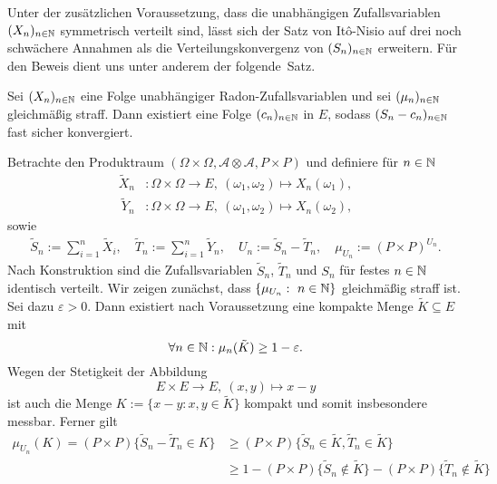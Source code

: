 Unter der zusätzlichen Voraussetzung, dass die unabhängigen Zufallsvariablen $(X_n)_{n \in \mathbb{N}}$ symmetrisch verteilt sind, lässt sich der Satz von Itô-Nisio auf drei noch schwächere Annahmen als die Verteilungskonvergenz von $(S_n)_{n \in \mathbb{N}}$ erweitern. 
Für den Beweis dient uns unter anderem der \mbox{folgende Satz.} 
\begin{theorem}
    Sei $(X_n)_{n \in \mathbb{N}}$ eine Folge unabhängiger Radon-Zufallsvariablen und sei $(\mu_n)_{n \in \mathbb{N}}$ gleichmäßig straff. Dann existiert eine Folge $(c_n)_{n \in \mathbb{N}}$ in $E$, sodass $(S_n - c_n)_{n \in \mathbb{N}}$ fast sicher konvergiert.
\end{theorem}

\begin{proof*}
    Betrachte den Produktraum $(\Omega \times \Omega, \mathcal{A} \otimes \mathcal{A}, P \times P)$ und definiere für $n \in \mathbb{N}$
    \begin{align*}
        \widetilde{X}_n&: \Omega \times \Omega \to E, \ (\omega_1, \omega_2) \mapsto X_n(\omega_1), \\\
        \widetilde{Y}_n&: \Omega \times \Omega \to E, \ (\omega_1, \omega_2) \mapsto X_n(\omega_2),
    \end{align*}
    sowie 
    \begin{align*}
        \widetilde{S}_n := \sum_{i = 1}^n \widetilde{X}_i, \quad \widetilde{T}_n := \sum_{i = 1}^n \widetilde{Y}_n, \quad U_n := \widetilde{S}_n - \widetilde{T}_n, \quad \mu_{U_n} := (P\times P)^{U_n}. 
    \end{align*}
    Nach Konstruktion sind die Zufallsvariablen $\widetilde{S}_n$, $\widetilde{T}_n$ und $S_n$ für festes $n \in \mathbb{N}$ identisch verteilt. Wir zeigen zunächst, dass $\{\mu_{U_n}: \ n \in \mathbb{N}\}$ gleichmäßig straff ist. 
    Sei dazu $\varepsilon > 0$. Dann existiert nach Voraussetzung eine kompakte Menge $\tilde{K} \subseteq E$ mit 
    $$
        \forall n \in \mathbb{N}: \mu_n(\tilde{K}) \geq 1 - \varepsilon. 
    $$
    Wegen der Stetigkeit der Abbildung 
    $$
        E \times E \to E, \ (x,y) \mapsto x - y
    $$
    ist auch die Menge $K := \{ x - y : x,y \in \tilde{K}\}$ kompakt und somit insbesondere messbar. Ferner gilt
    \begin{align*}
        \mu_{U_n}(K) = (P \times P)\{\widetilde{S}_n - \widetilde{T}_n \in K\} &\geq (P \times P)\{\widetilde{S}_n \in \tilde{K}, \widetilde{T}_n \in \tilde{K}\} \\\
                                                              &\geq 1 - (P \times P)\{\widetilde{S}_n \notin \tilde{K}\} - (P \times P)\{\widetilde{T}_n \notin \tilde{K}\} \\\

\end{align*}
\end{proof*}
